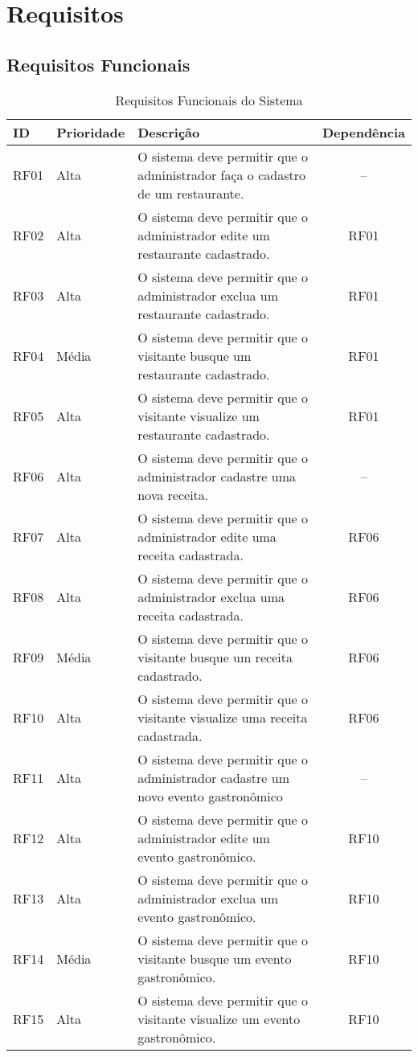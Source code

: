 \chapter[Requisitos]{Requisitos}

\section{Requisitos Funcionais}

\begin{table}[H]
\begin{tabular}{|l|l| p{10cm} |c|}
	\hline
	\textbf{ID} & \textbf{Prioridade} & \textbf{Descrição} & \textbf{Dependência}\tabularnewline
	\hline
	\hline
	RF01 & Alta & O sistema deve permitir que o administrador faça o cadastro de um restaurante. & --\tabularnewline
	\hline
	RF02 & Alta & O sistema deve permitir que o administrador edite um restaurante cadastrado. & RF01\tabularnewline
	\hline
	RF03 & Alta & O sistema deve permitir que o administrador exclua um restaurante cadastrado. & RF01\tabularnewline
	\hline
	RF04 & Média & O sistema deve permitir que o visitante busque um restaurante cadastrado. & RF01\tabularnewline
	\hline
	RF05 & Alta & O sistema deve permitir que o visitante visualize um restaurante cadastrado. & RF01\tabularnewline
	\hline
	RF06 & Alta & O sistema deve permitir que o administrador cadastre uma nova receita. & --\tabularnewline
	\hline
	RF07 & Alta & O sistema deve permitir que o administrador edite uma receita cadastrada. & RF06\tabularnewline
	\hline
	RF08 & Alta & O sistema deve permitir que o administrador exclua uma receita cadastrada. & RF06\tabularnewline
	\hline
	RF09 & Média & O sistema deve permitir que o visitante busque um receita cadastrado. & RF06\tabularnewline
	\hline
	RF10 & Alta & O sistema deve permitir que o visitante visualize uma receita cadastrada. & RF06\tabularnewline
	\hline
	RF11 & Alta & O sistema deve permitir que o administrador cadastre um novo evento gastronômico & --\tabularnewline
	\hline
	RF12 & Alta & O sistema deve permitir que o administrador edite um evento gastronômico. & RF10\tabularnewline
	\hline
	RF13 & Alta & O sistema deve permitir que o administrador exclua um evento gastronômico. & RF10\tabularnewline
	\hline
	RF14 & Média & O sistema deve permitir que o visitante busque um evento gastronômico. & RF10\tabularnewline
	\hline
	RF15 & Alta & O sistema deve permitir que o visitante visualize um evento gastronômico. & RF10\tabularnewline
	\hline
	\hline
\end{tabular}
\caption{Requisitos Funcionais do Sistema}
\label{Requisitos_Funcionais_do_Sistema}
\end{table}


